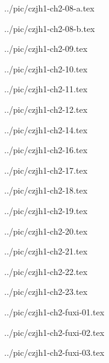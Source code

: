 

../pic/czjh1-ch2-08-a.tex



../pic/czjh1-ch2-08-b.tex



../pic/czjh1-ch2-09.tex



../pic/czjh1-ch2-10.tex



../pic/czjh1-ch2-11.tex



../pic/czjh1-ch2-12.tex



../pic/czjh1-ch2-14.tex



../pic/czjh1-ch2-16.tex



../pic/czjh1-ch2-17.tex



../pic/czjh1-ch2-18.tex



../pic/czjh1-ch2-19.tex



../pic/czjh1-ch2-20.tex



../pic/czjh1-ch2-21.tex



../pic/czjh1-ch2-22.tex



../pic/czjh1-ch2-23.tex



../pic/czjh1-ch2-fuxi-01.tex



../pic/czjh1-ch2-fuxi-02.tex



../pic/czjh1-ch2-fuxi-03.tex



